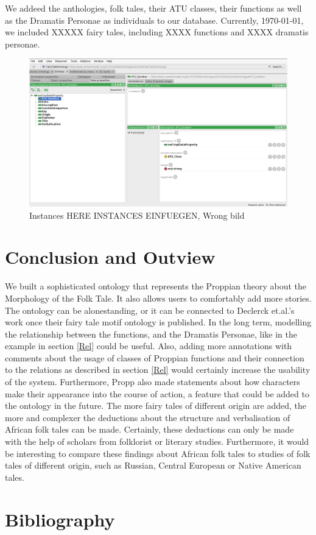 \documentclass[10pt,a4paper]{article}
\begin{document}
We addeed the anthologies, folk tales, their ATU classes, their functions as well as the Dramatis Personae as individuals to our database. Currently, \today , we included XXXXX fairy tales, including XXXX functions and XXXX dramatis personae.
\begin{figure}[H]
\centering
 	\includegraphics[scale=0.25]{Screen5.png}
 	\caption{Instances HERE INSTANCES EINFUEGEN, Wrong bild}
\end{figure}
\newpage



\section{Conclusion and Outview}
We built a sophisticated ontology that represents the Proppian theory about the Morphology of the Folk Tale.\cite{propp1968} It also allows users to comfortably add more stories. The ontology can be alonestanding, or it can be connected to Declerck et.al.'s \cite{Declerck2017} work once their fairy tale motif ontology is published. In the long term, modelling the relationship between the functions, and the Dramatis Personae, like in the example in section \ref{Rel} could be useful. Also, adding more annotations with comments about the usage of classes of Proppian functions and their connection to the relations as described in section \ref{Rel} would certainly increase the usability of the system. Furthermore, Propp also made statements about how characters make their appearance into the course of action, a feature that could be added to the ontology in the future. 
 The more fairy tales of different origin are added, the more and complexer the deductions about the structure and verbalisation of African folk tales can be made. Certainly, these deductions can only be made with the help of scholars from folklorist or literary studies. Furthermore, it would be interesting to compare these findings about African folk tales to studies of folk tales of different origin, such as Russian, Central European or Native American tales. 
\newpage
    
\section{Bibliography}

 

\end{document}
